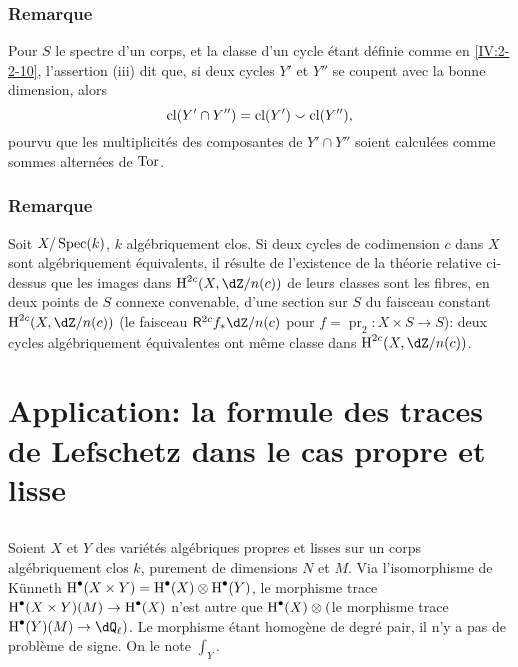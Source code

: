 \subsubsection{Remarque}\label{IV:2-3-9}

Pour $S$ le spectre d'un corps, et la classe d'un cycle étant définie comme 
en \ref{IV:2-2-10}, l'assertion (iii) dit que, si deux cycles $Y'$ et $Y''$ se 
coupent avec la bonne dimension, alors 
\[
  \operatorname{cl}(Y'\cap Y'') = \operatorname{cl}(Y')\smallsmile \operatorname{cl}(Y'')\text{,}
\]
pourvu que les multiplicités des composantes de $Y'\cap Y''$ soient 
calculées comme sommes alternées de $\operatorname{Tor}$. 





\subsubsection{Remarque}\label{IV:2-3-10}

Soit $X/\operatorname{Spec}(k)$, $k$ algébriquement clos. Si deux cycles de codimension $c$ 
dans $X$ sont algébriquement équivalents, il résulte de l'existence de la 
théorie relative ci-dessus que les images dans $\h^{2 c}(X,\dZ/n(c))$ de 
leurs classes sont les fibres, en deux points de $S$ connexe convenable, d'une 
section sur $S$ du faisceau constant $\h^{2 c}(X,\dZ/n(c))$ (le faisceau 
$\R^{2 c} f_\ast \dZ/n(c)$ pour $f=\operatorname{pr}_2:X\times S\to S$): deux 
cycles algébriquement équivalentes ont même classe dans 
$\h^{2 c}(X,\dZ/n(c))$. 




















\section{Application: la formule des traces de Lefschetz dans le cas propre et lisse}\label{IV:3}





\subsection{}\label{IV:3-1}

Soient $X$ et $Y$ des variétés algébriques propres et lisses sur un corps 
algébriquement clos $k$, purement de dimensions $N$ et $M$. Via 
l'isomorphisme de K\"unneth 
$\operatorname{H}^\bullet(X\times Y)=\operatorname{H}^\bullet(X)\otimes \operatorname{H}^\bullet(Y)$, le morphisme trace 
$\operatorname{H}^\bullet(X\times Y)(M)\to \operatorname{H}^\bullet(X)$ n'est autre que 
$\operatorname{H}^\bullet(X)\otimes ($le morphisme trace $\h^\bullet(Y)(M)\to \dQ_\ell)$. Le 
morphisme étant homogène de degré pair, il n'y a pas de problème de 
signe. On le note $\int_Y$. 





